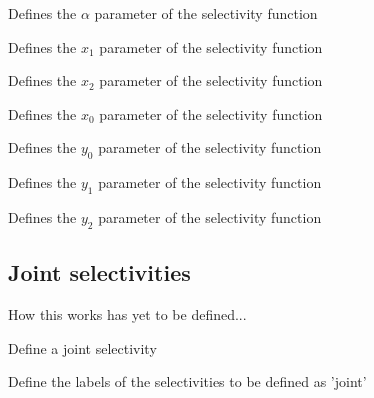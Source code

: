  {Defines the $\alpha$ parameter of the selectivity function}

 {Defines the $x_1$ parameter of the selectivity function}

 {Defines the $x_2$ parameter of the selectivity function}

 {Defines the $x_0$ parameter of the selectivity function}

 {Defines the $y_0$ parameter of the selectivity function}

 {Defines the $y_1$ parameter of the selectivity function}

 {Defines the $y_2$ parameter of the selectivity function}

\subsection{Joint selectivities}

How this works has yet to be defined...

 {Define a joint selectivity}

 {Define the labels of the selectivities to be defined as 'joint'}
